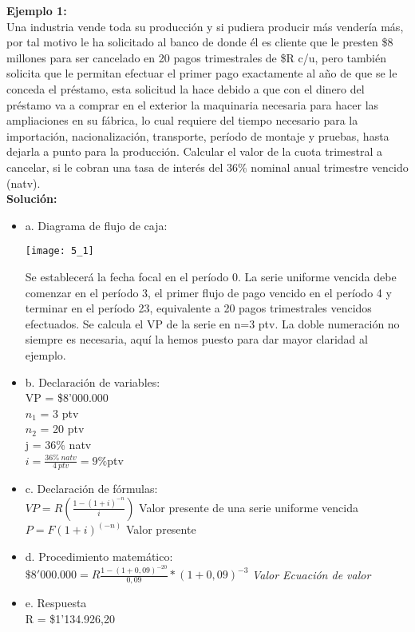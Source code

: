 \textbf{Ejemplo 1:}\\
Una  industria  vende  toda  su  producción  y  si  pudiera  producir  más  vendería  más, por  tal  motivo  le  ha  solicitado  al  banco  de  donde  él  es  cliente  que  le  presten  \$8 millones  para  ser  cancelado  en  20  pagos  trimestrales  de \$R c/u,  pero  también solicita  que le  permitan  efectuar  el  primer  pago  exactamente al  año  de  que  se le conceda  el  préstamo,  esta  solicitud  la  hace  debido  a  que  con  el  dinero  del  préstamo  va  a  comprar  en  el  exterior  la  maquinaria  necesaria  para  hacer  las ampliaciones en su fábrica, lo cual requiere del tiempo necesario para la importación, nacionalización, transporte, período de montaje y pruebas, hasta dejarla a punto para la producción. Calcular el valor de la cuota trimestral a cancelar, si le cobran una tasa de interés del 36\% nominal anual trimestre vencido (natv).\\

\textbf{Solución:}

\begin{itemize}
	\item a. Diagrama de flujo de caja:
	\begin{center}
		\texttt{[image: 5\_1]}
	\end{center}
	Se establecerá la fecha focal en el período 0. La serie uniforme vencida debe comenzar en el período 3, el primer flujo de pago vencido en el período 4 y terminar en el período 23, equivalente a 20 pagos trimestrales vencidos efectuados. Se calcula el VP de la serie en n=3 ptv. La doble numeración no siempre es necesaria, aquí la hemos puesto para dar mayor claridad al ejemplo.\\
	
	\item b. Declaración de variables:
	\\VP = \$8'000.000\\
	$n_{1}$ = 3 ptv\\
	$n_{2}$ = 20 ptv\\
	j = 36\% natv\\
	
	$i= \frac{36\% \ natv}{4 \ ptv} = 9\%$ptv\\
	

	
	\item c. Declaración de fórmulas:\\
	$VP = R(\frac{1-(1+i)^{-n}}{i})$ Valor presente de una serie uniforme vencida\\
	$P= F{(1+i)}^{(-n)}$ Valor presente\\
	
	\item d. Procedimiento matemático:\\
	$\$8'000.000 = R\frac{1-(1+0,09)^{-20}}{0,09}*(1+0,09)^{-3}$ \hspace{35 pt} \textit{Valor Ecuación de valor}\\
	\item e. Respuesta\\
	R = \$1'134.926,20\\
\end{itemize}


